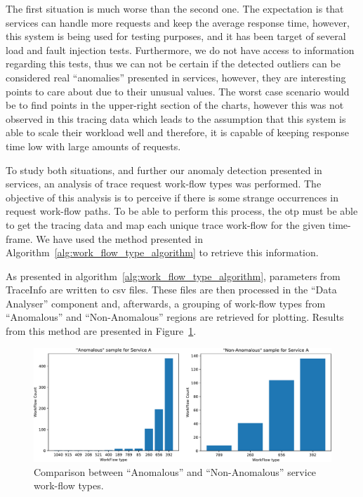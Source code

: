 The first situation is much worse than the second one. The expectation is that services can handle more requests and keep the average response time, however, this system is being used for testing purposes, and it has been target of several load and fault injection tests. Furthermore, we do not have access to information regarding this tests, thus we can not be certain if the detected outliers can be considered real ``anomalies'' presented in services, however, they are interesting points to care about due to their unusual values. The worst case scenario would be to find points in the upper-right section of the charts, however this was not observed in this tracing data which leads to the assumption that this system is able to scale their workload well and therefore, it is capable of keeping response time low with large amounts of requests.

To study both situations, and further our anomaly detection presented in services, an analysis of trace request work-flow types was performed. The objective of this analysis is to perceive if there is some strange occurrences in request work-flow paths. To be able to perform this process, the \gls{otp} must be able to get the tracing data and map each unique trace work-flow for the given time-frame. We have used the method presented in Algorithm~\ref{alg:work_flow_type_algorithm} to retrieve this information.


As presented in algorithm~\ref{alg:work_flow_type_algorithm}, parameters from TraceInfo are written to \gls{csv} files. These files are then processed in the ``Data Analyser'' component and, afterwards, a grouping of work-flow types from ``Anomalous'' and ``Non-Anomalous'' regions are retrieved for plotting. Results from this method are presented in Figure~\ref{fig:work_flow_type_analysis}.

\begin{figure}[H]
  \centerline{\includegraphics[width=1.0\linewidth]{images/workflow_type_count.pdf}}
  \captionsetup{justification=centering}
  \caption{Comparison between ``Anomalous'' and ``Non-Anomalous'' service work-flow types.}
  \label{fig:work_flow_type_analysis}
\end{figure}

